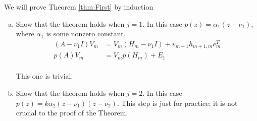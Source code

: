 \documentclass[10pt,letterpaper]{article}
\begin{document}
We will prove Theorem \ref{thm:First} by induction
\begin{enumerate}[(a)]
    \item Show that the theorem holds when $j=1$.  In this case $p(z) = \alpha_1\left(z-\nu_1\right)$, where $\alpha_1$ is some nonzero constant.
        \begin{subequations}
            \begin{align}
                \left(A-\nu_1I\right)V_m &= V_m\left(H_m-\nu_1I\right) + v_{m+1}h_{m+1,m}e_m^T \\
                p(A)V_m &= V_mp(H_m) + E_1 \\
            \end{align}
            \label{eq:j=1}
        \end{subequations}

        This one is trivial.
    \item Show that the theorem holds when $j=2$.  In this case $p(z) = k\alpha_2\left(z-\nu_1\right)\left(z-\nu_2\right)$.  This step is just for practice; it is not crucial to the proof of the Theorem.


\end{enumerate}
\end{document}

